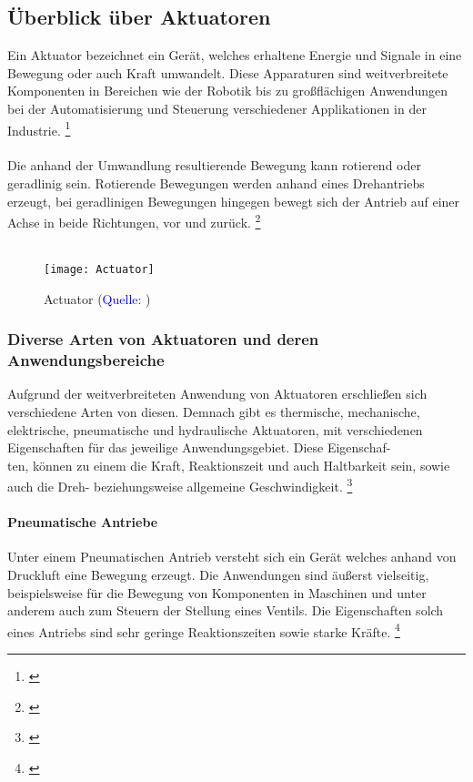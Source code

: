 \documentclass[titlepage,12pt,twoside]{article}
\begin{document}
\subsection{Überblick über Aktuatoren}
Ein Aktuator bezeichnet ein Gerät, welches erhaltene Energie und Signale 
in eine Bewegung oder auch Kraft umwandelt. Diese Apparaturen sind 
weitverbreitete Komponenten in Bereichen wie der Robotik bis zu 
großflächigen Anwendungen bei der Automatisierung und Steuerung 
verschiedener Applikationen in der Industrie. \footnote{\cite{Q1}} \\
\\
Die anhand der Umwandlung resultierende Bewegung kann rotierend oder 
geradlinig sein. Rotierende Bewegungen werden anhand eines Drehantriebs 
erzeugt, bei geradlinigen Bewegungen hingegen bewegt sich der Antrieb auf 
einer Achse in beide Richtungen, vor und zurück. \footnote{\cite{Q4}} \\
\\
\begin{figure}[H]
	\begin{center}
		\scalebox{0.8}
		{\texttt{[image: Actuator]}}
		\caption{Actuator (\textcolor{blue}{Quelle: \cite{Q4}})}
		\label{fig:Actuator}
	\end{center}
\end{figure}
\subsubsection{Diverse Arten von Aktuatoren und deren Anwendungsbereiche}
Aufgrund der weitverbreiteten Anwendung von Aktuatoren erschließen sich 
verschiedene Arten von diesen. Demnach gibt es thermische, mechanische, 
elektrische, pneumatische und hydraulische Aktuatoren, mit verschiedenen 
Eigenschaften für das jeweilige Anwendungsgebiet. Diese Eigenschaf-\\ten, 
können zu einem die Kraft, Reaktionszeit und auch Haltbarkeit sein, 
sowie auch die Dreh- beziehungsweise allgemeine Geschwindigkeit. \footnote{\cite{Q1}} \\
\paragraph{Pneumatische Antriebe}
\hfill \break
\hfill \break
Unter einem Pneumatischen Antrieb versteht sich ein Gerät welches anhand 
von Druckluft eine Bewegung erzeugt. Die Anwendungen sind äußerst 
vielseitig, beispielsweise für die Bewegung von Komponenten in Maschinen 
und unter anderem auch zum Steuern der Stellung eines Ventils. Die 
Eigenschaften solch eines Antriebs sind sehr geringe Reaktionszeiten 
sowie starke Kräfte. \footnote{\cite{Q1}} \\
\end{document}
